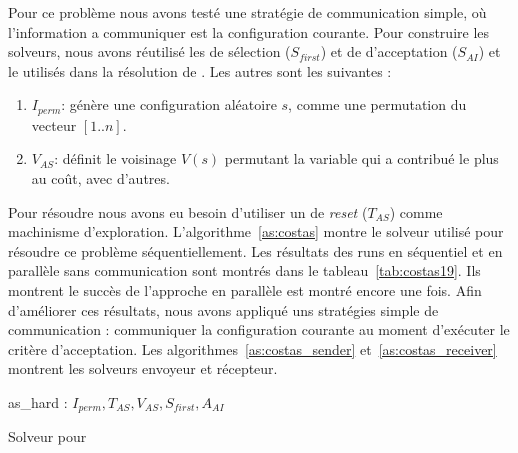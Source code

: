 \documentclass{jfpc-preprint}
\begin{document}
Pour ce problème nous avons testé une stratégie de communication simple, où l'information a communiquer est la configuration courante. Pour construire les solveurs, nous avons réutilisé les \oms{} de sélection ($S_{first}$) et de d'acceptation ($S_{AI}$) et le \opch{} utilisés dans la résolution de \SGP{}. Les autres \oms{} sont les suivantes :

\begin{enumerate}
	\item $I_{perm}$: génère une configuration aléatoire $s$, comme une permutation du vecteur $[1..n]$. 
	\item $V_{AS}$: définit le voisinage $V \left(s\right)$ permutant la variable qui a contribué le plus au coût, avec d'autres.
\end{enumerate}

Pour résoudre \CARRP{} nous avons eu besoin d'utiliser un \om{} de \textit{reset} ($T_{AS}$) comme machinisme d'exploration. L'algorithme~\ref{as:costas} montre le solveur utilisé pour résoudre ce problème séquentiellement. Les résultats des runs en séquentiel et en parallèle sans communication sont montrés dans le tableau~\ref{tab:costas19}. Ils montrent le succès de l'approche en parallèle est montré encore une fois. Afin d'améliorer ces résultats, nous avons appliqué uns stratégies   simple de communication : communiquer la configuration courante au moment d'exécuter le critère d'acceptation. Les algorithmes~\ref{as:costas_sender} et~\ref{as:costas_receiver} montrent les solveurs envoyeur et récepteur.

\begin{algorithm}
\dontprintsemicolon
\scriptsize
\SetNoline
{}
   as\_hard\;
\algoindent{} : $I_{perm}, T_{AS}, V_{AS}, S_{first}, A_{AI}$ \;
\caption{Solveur pour \CARRP}\label{as:costas}
\end{algorithm}

\begin{table}[t]
\captionsetup{belowskip=6pt,aboveskip=6pt}
\centering
\renewcommand{\arraystretch}{1}
\caption{Résultats pour \CARRP{} 19}
\label{tab:costas19}
\end{table}
\end{document}
